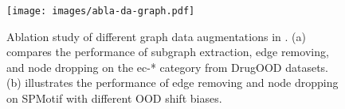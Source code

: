 
\begin{figure}
\begin{minipage}{0.48\textwidth}
  \centering
  
  \texttt{[image: images/abla-da-graph.pdf]}
  
  \caption{Ablation study of different graph data augmentations in \ours. (a) compares the performance of subgraph extraction, edge removing, and node dropping on the ec-* category from DrugOOD datasets. (b) illustrates the performance of edge removing and node dropping on SPMotif with different OOD shift biases.}
  \label{fig: da graph}
\end{minipage}
\hfill
\begin{minipage}{0.5\textwidth}
  \centering
    \resizebox{0.95\textwidth}{!}{%
     \label{tab:spmotif}
   \begin{tabular}{lccc}
  

\end{tabular}}
\end{minipage}
\end{figure}
